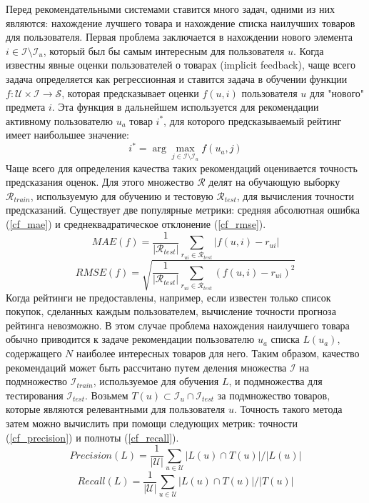 Перед рекомендательными системами ставится много задач, одними из них являются:
нахождение лучшего товара и нахождение списка наилучших товаров для пользователя.
Первая проблема заключается в нахождении нового элемента $i \in \mathcal{I} \setminus \mathcal{I}_u$,
который был бы самым интересным для пользователя $u$. Когда известны явные оценки
пользователей о товарах (implicit feedback), чаще всего задача определяется как
регрессионная и ставится задача в обучении функции $f: \mathcal{U} \times \mathcal{I} \to \mathcal{S}$,
которая предсказывает оценки $f(u, i)$ пользователя $u$ для "нового" предмета $i$.
Эта функция в дальнейшем используется для рекомендации активному пользователю $u_a$
товар $i^*$, для которого предсказываемый рейтинг имеет наибольшее значение:
\begin{equation}
  i^* = \arg \max_{j \in \mathcal{I} \setminus \mathcal{I}_u} f(u_a,j)
\end{equation}
\label{metrics} Чаще всего для определения качества таких рекомендаций оценивается точность предсказания
оценок. Для этого множество $\mathcal{R}$ делят на обучающую выборку $\mathcal{R}_{train}$,
используемую для обучению и тестовую $\mathcal{R}_{test}$, для вычисления точности
предсказаний. Существует две популярные метрики: средняя абсолютная ошибка (\ref{cf_mae}) и
среднеквадратическое отклонение (\ref{cf_rmse}).
\begin{equation}
  \label{cf_mae}
  MAE(f) = \frac{1}{|\mathcal{R}_{test}|} \sum_{r_{ui} \in \mathcal{R}_{test}} |f(u,i) - r_{ui}|
\end{equation}
\begin{equation}
  \label{cf_rmse}
  RMSE(f) = \sqrt{\frac{1}{|\mathcal{R}_{test}|} \sum_{r_{ui} \in \mathcal{R}_{test}} (f(u,i) - r_{ui})^2}
\end{equation}
Когда рейтинги не предоставлены, например, если известен только список покупок,
сделанных каждым пользователем, вычисление точности прогноза рейтинга невозможно.
В этом случае проблема нахождения наилучшего товара обычно приводится к задаче
рекомендации пользователю $u_a$ списка $L(u_a)$, содержащего $N$ наиболее интересных
товаров для него. Таким образом, качество рекомендаций может быть рассчитано путем
деления множества $\mathcal{I}$ на подмножество $\mathcal{I}_{train}$, используемое
для обучения $L$, и подмножества для тестирования $\mathcal{I}_{test}$. Возьмем
$T(u) \subset \mathcal{I}_u \cap \mathcal{I}_{test}$ за подмножество товаров, которые
являются релевантными для пользователя $u$. Точность такого метода затем можно
вычислить при помощи следующих метрик: точности (\ref{cf_precision}) и
полноты (\ref{cf_recall}).
\begin{equation}
  \label{cf_precision}
  Precision(L) = \frac{1}{|\mathcal{U}|} \sum_{u \in \mathcal{U}} |L(u) \cap T(u)| / |L(u)|
\end{equation}
\begin{equation}
  \label{cf_recall}
  Recall(L) = \frac{1}{|\mathcal{U}|} \sum_{u \in \mathcal{U}} |L(u) \cap T(u)| / |T(u)|
\end{equation}

